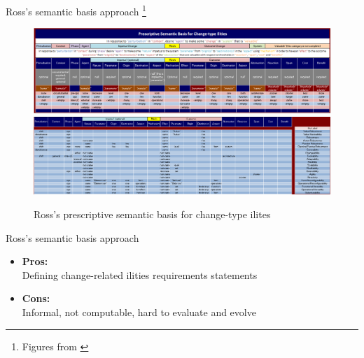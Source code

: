 \documentclass[xcolor=x11names,compress]{beamer}
\renewcommand{\(}{\begin{columns}}
\renewcommand{\)}{\end{columns}}
\newcommand{\<}[1]{\begin{column}{#1}}
\renewcommand{\>}{\end{column}}
\begin{document}
\begin{frame}{Ross's semantic basis approach \footnote{Figures from \cite{Ross:changeability}}}
\begin{figure}
\includegraphics[scale=0.22]{figures/semantic}
\vspace{0.4cm}
\includegraphics[scale=0.22]{figures/usesemantic}
\caption{Ross's prescriptive semantic basis for change-type ilites}
\end{figure}
\end{frame}



\begin{frame}{Ross's semantic basis approach}
\begin{itemize}
\item \textbf{Pros:} \\
	Defining change-related ilities requirements statements
\item \textbf{Cons:} \\
	Informal, not computable, hard to evaluate and evolve
\end{itemize}
\end{frame}

\end{document}
